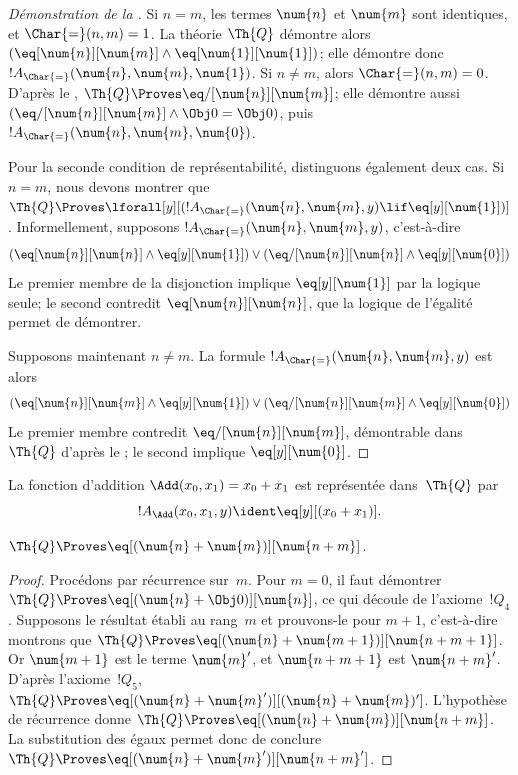\documentclass[../../../include/open-logic-section]{subfiles}
\begin{document}
\begin{proof}[Démonstration de la ]
Si $n=m$, les termes $\num{n}$ et $\num{m}$ sont identiques, et
$\Char{=}(n,m)=1$. La théorie $\Th{Q}$ démontre alors
$(\eq[\num{n}][\num{m}]\land\eq[\num{1}][\num{1}])$; elle
démontre donc $!A_{\Char{=}}(\num{n},\num{m},\num{1})$.
Si $n\neq m$, alors $\Char{=}(n,m)=0$. D'après le
, $\Th{Q}\Proves\eq/[\num{n}][\num{m}]$;
elle démontre aussi
$(\eq/[\num{n}][\num{m}]\land\Obj 0=\Obj 0)$, puis
$!A_{\Char{=}}(\num{n},\num{m},\num{0})$.

Pour la seconde condition de représentabilité, distinguons
également deux cas. Si $n=m$, nous devons montrer que
$\Th{Q}\Proves\lforall[y][(!A_{\Char{=}}(\num{n},\num{m},y)
\lif\eq[y][\num{1}])]$. Informellement, supposons
$!A_{\Char{=}}(\num{n},\num{m},y)$, c'est-à-dire
\[
(\eq[\num{n}][\num{n}] \land \eq[y][\num{1}]) \lor
(\eq/[\num{n}][\num{n}] \land \eq[y][\num{0}])
\]
Le premier membre de la disjonction implique
$\eq[y][\num{1}]$ par la logique seule; le second contredit
$\eq[\num{n}][\num{n}]$, que la logique de l'égalité permet
de démontrer.

Supposons maintenant $n\neq m$. La formule
$!A_{\Char{=}}(\num{n},\num{m},y)$ est alors
\[
(\eq[\num{n}][\num{m}] \land \eq[y][\num{1}]) \lor
(\eq/[\num{n}][\num{m}] \land \eq[y][\num{0}])
\]
Le premier membre contredit
$\eq/[\num{n}][\num{m}]$, démontrable dans~$\Th{Q}$ d'après le
; le second implique
$\eq[y][\num{0}]$.
\end{proof}

\begin{prop}
La fonction d'addition $\Add(x_0,x_1)=x_0+x_1$ est représentée
dans~$\Th{Q}$ par
\[
  !A_{\Add}(x_0, x_1, y) \ident \eq[y][(x_0 + x_1)].
\]
\end{prop}

\begin{lem}
$\Th{Q}\Proves\eq[(\num{n}+\num{m})][\num{n+m}]$.
\end{lem}

\begin{proof}
Procédons par récurrence sur~$m$. Pour $m=0$, il faut démontrer
$\Th{Q}\Proves\eq[(\num{n}+\Obj 0)][\num{n}]$, ce qui découle
de l'axiome~$!Q_4$. Supposons le résultat établi au rang~$m$
et prouvons-le pour $m+1$, c'est-à-dire montrons que
$\Th{Q}\Proves\eq[(\num{n}+\num{m+1})][\num{n+m+1}]$.
Or $\num{m+1}$ est le terme $\num{m}'$, et $\num{n+m+1}$ est
$\num{n+m}'$. D'après l'axiome~$!Q_5$,
$\Th{Q}\Proves\eq[(\num{n}+\num{m}')][(\num{n}+\num{m})']$.
L'hypothèse de récurrence donne
$\Th{Q}\Proves\eq[(\num{n}+\num{m})][\num{n+m}]$.
La substitution des égaux permet donc de conclure
$\Th{Q}\Proves\eq[(\num{n}+\num{m}')][\num{n+m}']$.
\end{proof}
\end{document}
